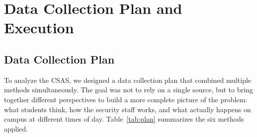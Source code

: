 \documentclass[12pt, onecolumn]{IEEEtran}
\begin{document}
\section{Data Collection Plan and Execution}

\subsection{Data Collection Plan}

To analyze the CSAS, we designed a data collection plan that combined
multiple methods simultaneously. The goal was not to rely on a single
source, but to bring together different perspectives to build a more
complete picture of the problem: what students think, how the security
staff works, and what actually happens on campus at different times of
day. Table~\ref{tab:plan} summarizes the six methods applied.
\end{document}
